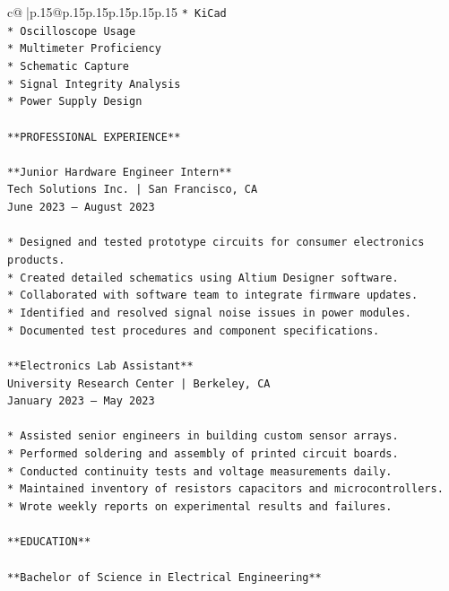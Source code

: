 \documentclass{article}
\begin{document}
{\begin{supertabular}{c@{$\;$}|p{.15\linewidth}@{}p{.15\linewidth}p{.15\linewidth}p{.15\linewidth}p{.15\linewidth}p{.15\linewidth}}
{{{\texttt{*   KiCad} \\
\texttt{*   Oscilloscope Usage} \\
\texttt{*   Multimeter Proficiency} \\
\texttt{*   Schematic Capture} \\
\texttt{*   Signal Integrity Analysis} \\
\texttt{*   Power Supply Design} \\
\\ 
\texttt{**PROFESSIONAL EXPERIENCE**} \\
\\ 
\texttt{**Junior Hardware Engineer Intern**} \\
\texttt{Tech Solutions Inc. | San Francisco, CA} \\
\texttt{June 2023 – August 2023} \\
\\ 
\texttt{*   Designed and tested prototype circuits for consumer electronics products.} \\
\texttt{*   Created detailed schematics using Altium Designer software.} \\
\texttt{*   Collaborated with software team to integrate firmware updates.} \\
\texttt{*   Identified and resolved signal noise issues in power modules.} \\
\texttt{*   Documented test procedures and component specifications.} \\
\\ 
\texttt{**Electronics Lab Assistant**} \\
\texttt{University Research Center | Berkeley, CA} \\
\texttt{January 2023 – May 2023} \\
\\ 
\texttt{*   Assisted senior engineers in building custom sensor arrays.} \\
\texttt{*   Performed soldering and assembly of printed circuit boards.} \\
\texttt{*   Conducted continuity tests and voltage measurements daily.} \\
\texttt{*   Maintained inventory of resistors capacitors and microcontrollers.} \\
\texttt{*   Wrote weekly reports on experimental results and failures.} \\
\\ 
\texttt{**EDUCATION**} \\
\\ 
\texttt{**Bachelor of Science in Electrical Engineering**} \\
}}}
\end{supertabular}}
\end{document}
